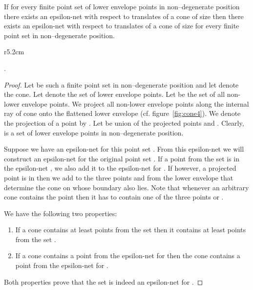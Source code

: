 \documentclass{stacs_proc}
\begin{document}
\begin{lemma}
  \label{lem:1}
  If for every finite point set  of lower envelope points in
  non--degenerate position there exists 
  an epsilon-net with respect to translates of a cone  of size
   then there exists 
  an epsilon-net with respect to translates of a cone  of size
   for every finite point 
  set   in non--degenerate position.
\end{lemma}
\begin{wrapfigure}[12]{r}{5.2cm}
  \begin{center}
    \caption{The projection of points onto flattened lower envelope.}
    \label{fig:cone4}
  \end{center}
\end{wrapfigure}
.\vspace{-4ex}
\begin{proof}
  Let  be such a finite point set in non--degenerate
  position and let  denote the cone. Let  denote the set of
  lower envelope points. Let  be the set of all
  non-lower envelope points.   
We project all non-lower envelope points  along the
  internal ray  of cone  onto the flattened lower envelope
  (cf. figure~\ref{fig:cone4}). We denote the projection of a point
   by . 
  Let  be union of the projected points and . Clearly,  is
  a set of lower envelope points in non--degenerate position.  

  Suppose we have an epsilon-net  for this point
  set . From this epsilon-net  we will construct an
  epsilon-net  for the original point set . If a point from the set
   is in the epsilon-net , we also add it to the epsilon-net
   for . If however, a projected point  is in  then we
  add to  the three points  and  from the lower envelope  that determine the cone  on whose boundary also  lies. Note that whenever an arbitrary cone contains the point  then it has to contain one of the three points  or . 



  We have the following two properties:
  \begin{enumerate}
  \item If a cone contains at least  points from the set  then
    it contains at least  points from the set . 
  \item If a cone contains a point from the epsilon-net  for 
    then the cone contains a point from the epsilon-net  for .  
  \end{enumerate}    
  Both properties prove that the 
set  is indeed an epsilon-net for .
\end{proof}
\end{document}

